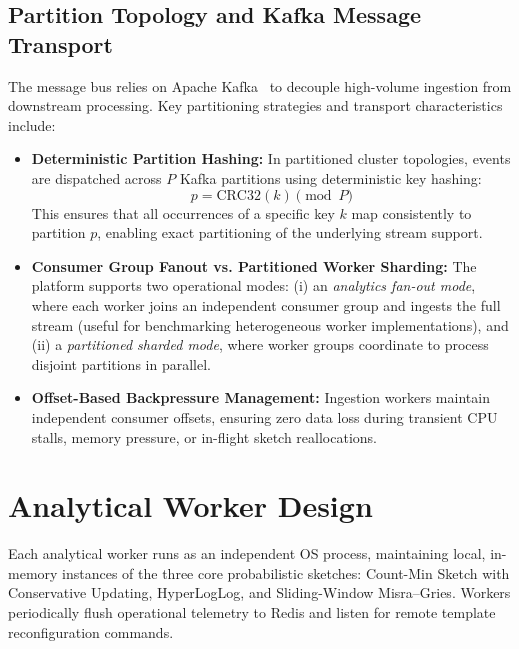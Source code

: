 \subsection{Partition Topology and Kafka Message Transport}
The message bus relies on Apache Kafka~\cite{kafka} to decouple high-volume ingestion from downstream processing. Key partitioning strategies and transport characteristics include:
\begin{itemize}
 \item \textbf{Deterministic Partition Hashing:} In partitioned cluster topologies, events are dispatched across $P$ Kafka partitions using deterministic key hashing:
 \begin{equation}
        p = \text{CRC32}(k) \pmod P
    \end{equation}
 This ensures that all occurrences of a specific key $k$ map consistently to partition $p$, enabling exact partitioning of the underlying stream support.
 \item \textbf{Consumer Group Fanout vs. Partitioned Worker Sharding:} The platform supports two operational modes: (i) an \textit{analytics fan-out mode}, where each worker joins an independent consumer group and ingests the full stream (useful for benchmarking heterogeneous worker implementations), and (ii) a \textit{partitioned sharded mode}, where worker groups coordinate to process disjoint partitions in parallel.
 \item \textbf{Offset-Based Backpressure Management:} Ingestion workers maintain independent consumer offsets, ensuring zero data loss during transient CPU stalls, memory pressure, or in-flight sketch reallocations.
\end{itemize}

\section{Analytical Worker Design}

Each analytical worker runs as an independent OS process, maintaining local, in-memory instances of the three core probabilistic sketches: Count-Min Sketch with Conservative Updating, HyperLogLog, and Sliding-Window Misra--Gries. Workers periodically flush operational telemetry to Redis and listen for remote template reconfiguration commands.

